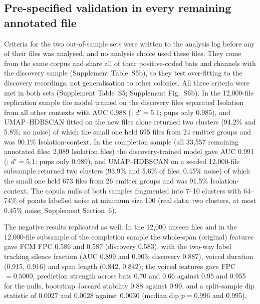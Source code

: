 \subsection{Pre-specified validation in every remaining annotated file}\label{sec:repl}
Criteria for the two out-of-sample sets were written to the analysis log before any of their files was analysed, and no analysis choice used these files. They come from the same corpus and share all of their positive-coded bats and channels with the discovery sample (Supplement Table~S5b), so they test over-fitting to the discovery recordings, not generalisation to other colonies. All three criteria were met in both sets (Supplement Table~S5; Supplement Fig.~S6b). In the 12,000-file replication sample the model trained on the discovery files separated Isolation from all other contexts with AUC 0.988 (; $d'=5.1$; pups only 0.985), and UMAP--HDBSCAN fitted on the new files alone returned two clusters (94.2\% and 5.8\%; no noise) of which the small one held 695 files from 24 emitter groups and was 90.1\% Isolation-context. In the completion sample (all 33,557 remaining annotated files; 2,089 Isolation files) the discovery-trained model gave AUC 0.991 (; $d'=5.1$; pups only 0.989), and UMAP--HDBSCAN on a seeded 12,000-file subsample returned two clusters (93.9\% and 5.6\% of files; 0.45\% noise) of which the small one held 673 files from 26 emitter groups and was 91.5\% Isolation-context. The copula nulls of both samples fragmented into 7--10 clusters with 64--74\% of points labelled noise at minimum size 100 (real data: two clusters, at most 0.45\% noise; Supplement Section~6).


The negative results replicated as well. In the 12,000 unseen files and in the 12,000-file subsample of the completion sample the whole-span (original) features gave FCM FPC 0.586 and 0.587 (discovery 0.583), with the two-way label tracking silence fraction (AUC 0.899 and 0.903; discovery 0.887), voiced duration (0.915, 0.916) and span length (0.842, 0.842); the voiced features gave FPC $=0.5000$, prediction strength across bats 0.70 and 0.66 against 0.95 and 0.955 for the nulls, bootstrap Jaccard stability 0.88 against 0.99, and a split-sample dip statistic of 0.0027 and 0.0028 against 0.0030 (median dip $p=0.996$ and 0.995).

